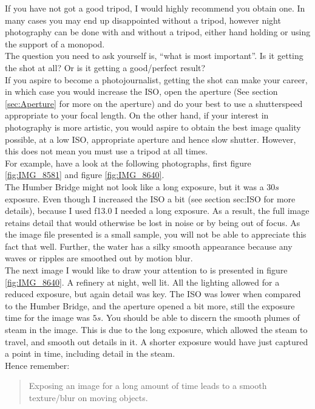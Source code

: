 If you have not got a good tripod, I would highly recommend you obtain one. In many cases you may end up disappointed without a tripod, however night photography can be done with and without a tripod, either hand holding or using the support of a monopod.
\\[\baselineskip]
The question you need to ask yourself is, ``what is most important''. Is it getting the shot at all? Or is it getting a good/perfect result?
\\
If you aspire to become a photojournalist, getting the shot can make your career, in which case you would increase the \gls{ISO}, open the \gls{aperture} (See section \ref{sec:Aperture} for more on the \gls{aperture}) and do your best to use a \gls{shutterspeed} appropriate to your focal length. On the other hand, if your interest in photography is more artistic, you would aspire to obtain the best image quality possible, at a low \gls{ISO}, appropriate aperture and hence slow \gls{shutter}. However, this does not mean you must use a tripod at all times.
\\[\baselineskip]
For example, have a look at the following photographs, first figure \ref{fig:IMG_8581} and figure \ref{fig:IMG_8640}.
\\
The Humber Bridge might not look like a long \gls{exposure}, but it was a $30s$ \gls{exposure}. Even though I increased the \gls{ISO} a bit (see section {sec:ISO} for more details), because I used f13.0 I needed a long \gls{exposure}. As a result, the full image retains detail that would otherwise be lost in noise or by being out of focus. As the image file presented is a small sample, you will not be able to appreciate this fact that well. Further, the water has a silky smooth appearance because any waves or ripples are smoothed out by motion blur.
\\[\baselineskip]
The next image I would like to draw your attention to is presented in figure \ref{fig:IMG_8640}. A refinery at night, well lit. All the lighting allowed for a reduced \gls{exposure}, but again detail was key. The \gls{ISO} was lower when compared to the Humber Bridge, and the \gls{aperture} opened a bit more, still the \gls{exposure} time for the image was $5s$. You should be able to discern the smooth plumes of steam in the image. This is due to the long \gls{exposure}, which allowed the steam to travel, and smooth out details in it. A shorter \gls{exposure} would have just captured a point in time, including detail in the steam.
\\[\baselineskip]
Hence remember:
\begin{quote}
Exposing an image for a long amount of time leads to a smooth texture/blur on moving objects.
\end{quote}

